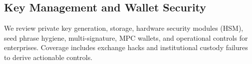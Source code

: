 \subsection{Key Management and Wallet Security}
We review private key generation, storage, hardware security modules (HSM), seed phrase hygiene, multi-signature, MPC wallets, and operational controls for enterprises. Coverage includes exchange hacks and institutional custody failures to derive actionable controls.



